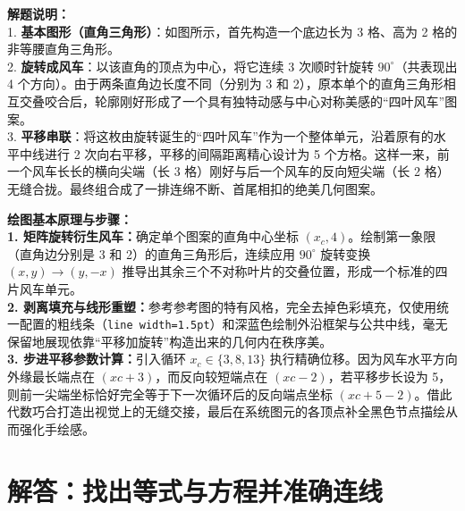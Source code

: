 \documentclass[12pt, a4paper]{ctexrep}
\begin{document}
\vspace{0.6cm}

{\small\color{gray}
\textbf{解题说明：}\\
1. \textbf{基本图形（直角三角形）}：如图所示，首先构造一个底边长为 3 格、高为 2 格的非等腰直角三角形。\\
2. \textbf{旋转成风车}：以该直角的顶点为中心，将它连续 3 次顺时针旋转 $90^\circ$（共表现出 4 个方向）。由于两条直角边长度不同（分别为 3 和 2），原本单个的直角三角形相互交叠咬合后，轮廓刚好形成了一个具有独特动感与中心对称美感的“四叶风车”图案。\\
3. \textbf{平移串联}：将这枚由旋转诞生的“四叶风车”作为一个整体单元，沿着原有的水平中线进行 2 次向右平移，平移的间隔距离精心设计为 5 个方格。这样一来，前一个风车长长的横向尖端（长 3 格）刚好与后一个风车的反向短尖端（长 2 格）无缝合拢。最终组合成了一排连绵不断、首尾相扣的绝美几何图案。
}

\vspace{0.6cm}

{\small\color{blue!70!black}
\textbf{绘图基本原理与步骤：}\\
\textbf{1. 矩阵旋转衍生风车：}确定单个图案的直角中心坐标 $(x_c, 4)$。绘制第一象限（直角边分别是 3 和 2）的直角三角形后，连续应用 $90^\circ$ 旋转变换 $(x,y) \to (y,-x)$ 推导出其余三个不对称叶片的交叠位置，形成一个标准的四片风车单元。\\
\textbf{2. 剥离填充与线形重塑：}参考参考图的特有风格，完全去掉色彩填充，仅使用统一配置的粗线条（\texttt{line width=1.5pt}）和深蓝色绘制外沿框架与公共中线，毫无保留地展现依靠“平移加旋转”构造出来的几何内在秩序美。\\
\textbf{3. 步进平移参数计算：}引入循环 $x_c \in \{3, 8, 13\}$ 执行精确位移。因为风车水平方向外缘最长端点在 $(xc+3)$，而反向较短端点在 $(xc-2)$，若平移步长设为 5，则前一尖端坐标恰好完全等于下一次循环后的反向端点坐标 $(xc+5-2)$。借此代数巧合打造出视觉上的无缝交接，最后在系统图元的各顶点补全黑色节点描绘从而强化手绘感。
}

\newpage

\section{解答：找出等式与方程并准确连线}

\vspace{0.6cm}
\end{document}
